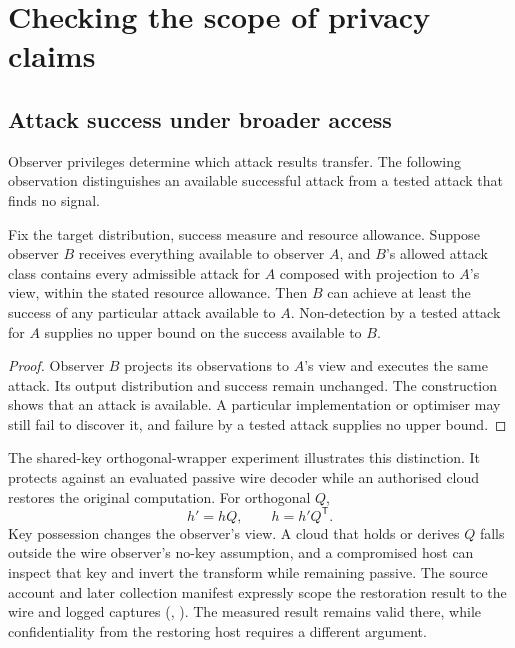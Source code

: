 \section{Checking the scope of privacy claims}
\label{sec:scopechecks}

\subsection{Attack success under broader access}

Observer privileges determine which attack results transfer. The following
observation distinguishes an available successful attack from a tested
attack that finds no signal.

\begin{samepage}
\begin{proposition}
Fix the target distribution, success measure and resource allowance.
Suppose observer $B$ receives everything available to observer $A$, and
$B$'s allowed attack class contains every admissible attack for $A$
composed with projection to $A$'s view, within the stated resource
allowance. Then $B$ can achieve at least the success of any particular
attack available to $A$. Non-detection by a tested attack for $A$ supplies
no upper bound on the success available to $B$.
\end{proposition}
\begin{proof}
Observer $B$ projects its observations to $A$'s view and executes the same
attack. Its output distribution and success remain unchanged. The
construction shows that an attack is available. A particular implementation
or optimiser may still fail to discover it, and failure by a tested attack
supplies no upper bound.
\end{proof}
\end{samepage}

The shared-key orthogonal-wrapper experiment illustrates this distinction.
It protects against an evaluated passive wire decoder while an authorised
cloud restores the original computation. For orthogonal $Q$,
\begin{equation}
 h'=hQ,\qquad h=h'Q^{\mathsf T}.
 \label{eq:rotation}
\end{equation}
Key possession changes the observer's view. A cloud that holds or derives
$Q$ falls outside the wire observer's no-key assumption, and a compromised
host can inspect that key and invert the transform while remaining passive.
The source account and later collection manifest expressly scope the
restoration result to the wire and logged captures (,
). The measured result remains valid there, while
confidentiality from the restoring host requires a different argument.

